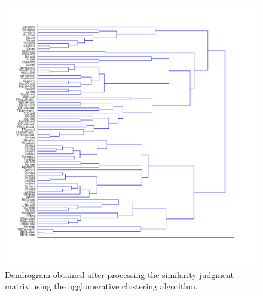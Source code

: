 \documentclass{article}
\begin{document}
\begin{figure}
\center
\includegraphics[width = \textwidth]{figures/dendrogram.pdf}
\caption{Dendrogram obtained after processing the similarity judgment matrix using the agglomerative clustering algorithm.}
\label{fig:dendrogram}
\end{figure}
\end{document}
